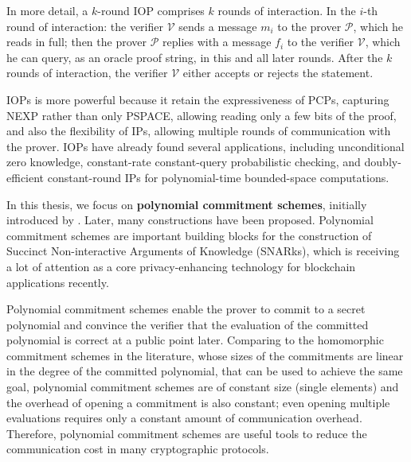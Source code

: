 In more detail, a $k$-round IOP comprises $k$ rounds of interaction. In the $i$-th round of interaction: the verifier $\mathcal{V}$ sends a message $m_i$ to the prover $\mathcal{P}$, which he reads in full; then the prover $\mathcal{P}$ replies with a message $f_i$ to the verifier $\mathcal{V}$, which he can query, as an oracle proof string, in this and all later rounds. After the $k$ rounds of interaction, the verifier $\mathcal{V}$ either accepts or rejects the statement.

IOPs is more powerful because 
it retain the expressiveness of PCPs, 
capturing NEXP rather than only PSPACE,
allowing reading only a few bits of the proof,
and also the flexibility of IPs, 
allowing multiple rounds of communication with the prover. 
IOPs have already found several applications, including unconditional
zero knowledge, 
constant-rate constant-query probabilistic checking, 
and doubly-efficient constant-round IPs for polynomial-time bounded-space computations.


In this thesis, we focus on \textbf{polynomial commitment schemes}, 
initially introduced by \cite{DBLP:conf/asiacrypt/KateZG10}.
Later, many constructions 
\cite{DBLP:conf/sp/TomescuCZAPGD20} 
\cite{DBLP:journals/iacr/YurekLFKM21} 
\cite{277222}
have been proposed.
Polynomial commitment schemes are important building blocks for the construction of Succinct Non-interactive Arguments of Knowledge (SNARks), 
which is receiving a lot of attention as a core privacy-enhancing technology for blockchain applications recently.

Polynomial commitment schemes enable the prover to commit to a secret polynomial and convince the verifier that the evaluation of the committed polynomial is correct at a public point later.
Comparing to the homomorphic commitment schemes in the literature, 
whose sizes of the commitments are linear in the degree of the committed polynomial, 
that can be used to achieve the same goal,
polynomial commitment schemes are of constant size (single elements)
and the overhead of opening a commitment is also constant; even opening multiple evaluations requires only a constant amount of communication overhead. Therefore, polynomial commitment schemes are useful tools to reduce the communication cost in many cryptographic protocols.


